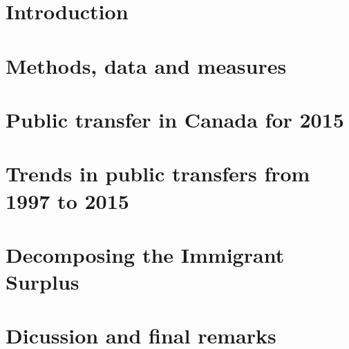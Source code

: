 \section{Introduction}
  
  \label{sec:ntaIntro}

\section{Methods, data and measures }
  

\section{Public transfer in Canada for 2015}
  
  \label{sec:life}

\section{Trends in public transfers from 1997 to 2015}
  
  \label{sec:crude}
\section{Decomposing the Immigrant Surplus}
    
    \label{sec:decomp}

\section{Dicussion and final remarks}
  
  \label{sec:ntaOutro}

